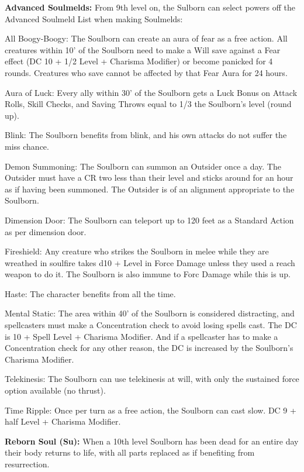 \textbf{Advanced Soulmelds:} From 9th level on, the Sulborn can select powers off the Advanced Soulmeld List when making Soulmelds:
\begin{description*}
\item[All Boogy-Boogy:] The Soulborn can create an aura of fear as a free action. All creatures within 10' of the Soulborn need to make a Will save against a Fear effect (DC 10 + 1/2 Level + Charisma Modifier) or become panicked for 4 rounds. Creatures who save cannot be affected by that Fear Aura for 24 hours.
\item[Aura of Luck:] Every ally within 30' of the Soulborn gets a Luck Bonus on Attack Rolls, Skill Checks, and Saving Throws equal to 1/3 the Soulborn's level (round up).
\item[Blink:] The Soulborn benefits from blink, and his own attacks do not suffer the miss chance.
\item[Demon Summoning:] The Soulborn can summon an Outsider once a day. The Outsider must have a CR two less than their level and sticks around for an hour as if having been summoned. The Outsider is of an alignment appropriate to the Soulborn.
\item[Dimension Door:] The Soulborn can teleport up to 120 feet as a Standard Action as per dimension door.
\item[Fireshield:] Any creature who strikes the Soulborn in melee while they are wreathed in soulfire takes d10 + Level in Force Damage unless they used a reach weapon to do it. The Soulborn is also immune to Forc Damage while this is up.
\item[Haste:] The character benefits from  all the time.
\item[Mental Static:] The area within 40' of the Soulborn is considered distracting, and spellcasters must make a Concentration check to avoid losing spells cast. The DC is 10 + Spell Level + Charisma Modifier. And if a spellcaster has to make a Concentration check for any other reason, the DC is increased by the Soulborn's Charisma Modifier.
\item[Telekinesis:] The Soulborn can use telekinesis at will, with only the sustained force option available (no thrust).
\item[Time Ripple:] Once per turn as a free action, the Soulborn can cast slow. DC 9 + half Level + Charisma Modifier.
\end{description*}

\textbf{Reborn Soul (Su):} When a 10th level Soulborn has been dead for an entire day their body returns to life, with all parts replaced as if benefiting from resurrection.

